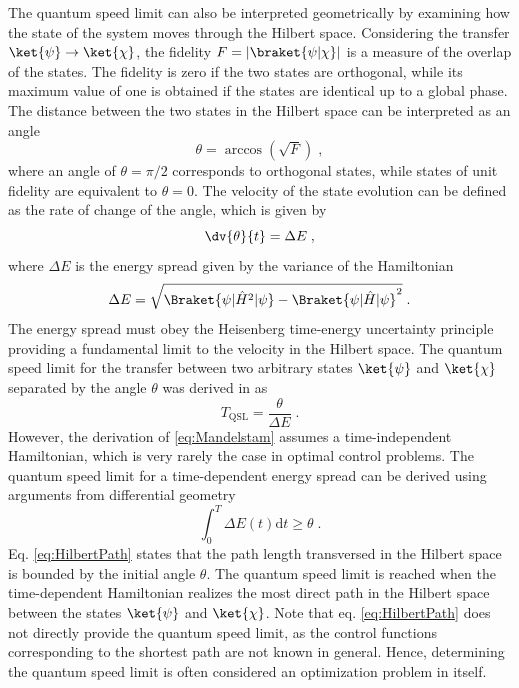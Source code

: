 The quantum speed limit can also be interpreted geometrically by examining how the state of the system moves through the Hilbert space. Considering the transfer $\ket{\psi} \to \ket{\chi}$, the fidelity $F = |\braket{\psi | \chi}|$ is a measure of the overlap of the states. The fidelity is zero if the two states are orthogonal, while its maximum value of one is obtained if the states are identical up to a global phase. The distance between the two states in the Hilbert space can be interpreted as an angle \cite{Wootters1981}
\begin{equation}
	\theta = \arccos \left( \sqrt{F} \right) \; ,
\end{equation}
where an angle of $\theta = \pi / 2 $ corresponds to orthogonal states, while states of unit fidelity are equivalent to $\theta = 0 $. The velocity of the state evolution can be defined as the rate of change of the angle, which is given by \cite{Aharonov}
\begin{equation}
	\dv{\theta}{t} = \Delta E \; ,
\end{equation}
where $\Delta E$ is the energy spread given by the variance of the Hamiltonian
\begin{equation}
	\Delta E  =  \sqrt{\Braket{\psi | \hat{H}^ 2 | \psi} - \Braket{\psi | \hat{H} | \psi} ^ 2 } \; .
\end{equation}
The energy spread must obey the Heisenberg time-energy uncertainty principle providing a fundamental limit to the velocity in the Hilbert space. The quantum speed limit for the transfer between two arbitrary states $\ket{\psi}$ and $\ket{\chi}$ separated by the angle $\theta$ was derived in \cite{Mandelstam1991} as
\begin{equation}
	T_{\mathrm{QSL}} = \frac{\theta}{\Delta E} \; . \label{eq:Mandelstam}
\end{equation}
However, the derivation of \eqref{eq:Mandelstam} assumes a time-independent Hamiltonian, which is very rarely the case in optimal control problems. The quantum speed limit for a time-dependent energy spread can be derived using arguments from differential geometry \cite{Aharonov,beyondQSL}
\begin{equation}
	\int_{0}^{T} \Delta E(t) \mathrm{d}t \geq \theta \; . \label{eq:HilbertPath}
\end{equation}
Eq. \eqref{eq:HilbertPath} states that the path length transversed in the Hilbert space is bounded by the initial angle $\theta$. The quantum speed limit is reached when the time-dependent Hamiltonian realizes the most direct path in the Hilbert space between the states $\ket{\psi}$ and $\ket{\chi}$. Note that eq. \eqref{eq:HilbertPath} does not directly provide the quantum speed limit, as the control functions corresponding to the shortest path are not known in general.
Hence, determining the quantum speed limit is often considered an optimization problem in itself.

